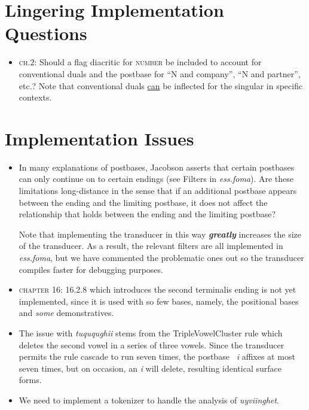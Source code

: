 \documentclass{article}
\begin{document}
\section{Lingering Implementation Questions}

\begin{itemize}
\renewcommand\labelitemi{$\cdot$}

\item \textsc{ch.2}: Should a flag diacritic for \textsc{number} be included to account for conventional duals and the postbase for ``N and company'', ``N and partner'', etc.?
%
Note that conventional duals \ul{can} be inflected for the singular in specific contexts.

\end{itemize}


\section{Implementation Issues}

\begin{itemize}
\renewcommand\labelitemi{$\cdot$}

\item In many explanations of postbases, Jacobson asserts that certain postbases can only continue on to certain endings (see Filters in \textit{ess.foma}).
%
Are these limitations long-distance in the sense that if an additional postbase appears between the ending and the limiting postbase, it does not affect the relationship that holds between the ending and the limiting postbase?

Note that implementing the transducer in this way \textit{\textbf{greatly}} increases the size of the transducer.
%
As a result, the relevant filters are all implemented in \textit{ess.foma}, but we have commented the problematic ones out so the transducer compiles faster for debugging purposes.

\item \textsc{chapter 16}: 16.2.8 which introduces the second terminalis ending is not yet implemented, since it is used with so few bases, namely, the positional bases and \textit{some} demonstratives.

\item The issue with \textit{tuququghii} stems from the TripleVowelCluster rule which deletes the second vowel in a series of three vowels.
%
Since the transducer permits the rule cascade to run seven times, the postbase \textit{~i} affixes at most seven times, but on occasion, an \textit{i} will delete, resulting identical surface forms.

\item We need to implement a tokenizer to handle the analysis of \textit{uyviinghet}.

\end{itemize}
\end{document}
